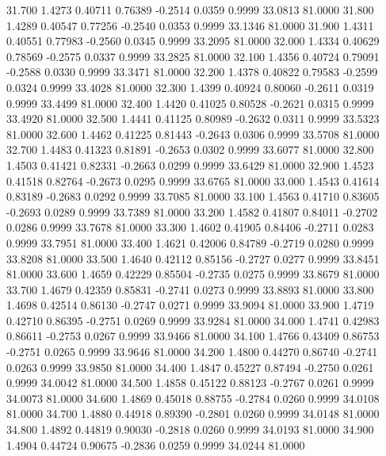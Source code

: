   31.700   1.4273   0.40711   0.76389  -0.2514   0.0359   0.9999  33.0813  81.0000
  31.800   1.4289   0.40547   0.77256  -0.2540   0.0353   0.9999  33.1346  81.0000
  31.900   1.4311   0.40551   0.77983  -0.2560   0.0345   0.9999  33.2095  81.0000
  32.000   1.4334   0.40629   0.78569  -0.2575   0.0337   0.9999  33.2825  81.0000
  32.100   1.4356   0.40724   0.79091  -0.2588   0.0330   0.9999  33.3471  81.0000
  32.200   1.4378   0.40822   0.79583  -0.2599   0.0324   0.9999  33.4028  81.0000
  32.300   1.4399   0.40924   0.80060  -0.2611   0.0319   0.9999  33.4499  81.0000
  32.400   1.4420   0.41025   0.80528  -0.2621   0.0315   0.9999  33.4920  81.0000
  32.500   1.4441   0.41125   0.80989  -0.2632   0.0311   0.9999  33.5323  81.0000
  32.600   1.4462   0.41225   0.81443  -0.2643   0.0306   0.9999  33.5708  81.0000
  32.700   1.4483   0.41323   0.81891  -0.2653   0.0302   0.9999  33.6077  81.0000
  32.800   1.4503   0.41421   0.82331  -0.2663   0.0299   0.9999  33.6429  81.0000
  32.900   1.4523   0.41518   0.82764  -0.2673   0.0295   0.9999  33.6765  81.0000
  33.000   1.4543   0.41614   0.83189  -0.2683   0.0292   0.9999  33.7085  81.0000
  33.100   1.4563   0.41710   0.83605  -0.2693   0.0289   0.9999  33.7389  81.0000
  33.200   1.4582   0.41807   0.84011  -0.2702   0.0286   0.9999  33.7678  81.0000
  33.300   1.4602   0.41905   0.84406  -0.2711   0.0283   0.9999  33.7951  81.0000
  33.400   1.4621   0.42006   0.84789  -0.2719   0.0280   0.9999  33.8208  81.0000
  33.500   1.4640   0.42112   0.85156  -0.2727   0.0277   0.9999  33.8451  81.0000
  33.600   1.4659   0.42229   0.85504  -0.2735   0.0275   0.9999  33.8679  81.0000
  33.700   1.4679   0.42359   0.85831  -0.2741   0.0273   0.9999  33.8893  81.0000
  33.800   1.4698   0.42514   0.86130  -0.2747   0.0271   0.9999  33.9094  81.0000
  33.900   1.4719   0.42710   0.86395  -0.2751   0.0269   0.9999  33.9284  81.0000
  34.000   1.4741   0.42983   0.86611  -0.2753   0.0267   0.9999  33.9466  81.0000
  34.100   1.4766   0.43409   0.86753  -0.2751   0.0265   0.9999  33.9646  81.0000
  34.200   1.4800   0.44270   0.86740  -0.2741   0.0263   0.9999  33.9850  81.0000
  34.400   1.4847   0.45227   0.87494  -0.2750   0.0261   0.9999  34.0042  81.0000
  34.500   1.4858   0.45122   0.88123  -0.2767   0.0261   0.9999  34.0073  81.0000
  34.600   1.4869   0.45018   0.88755  -0.2784   0.0260   0.9999  34.0108  81.0000
  34.700   1.4880   0.44918   0.89390  -0.2801   0.0260   0.9999  34.0148  81.0000
  34.800   1.4892   0.44819   0.90030  -0.2818   0.0260   0.9999  34.0193  81.0000
  34.900   1.4904   0.44724   0.90675  -0.2836   0.0259   0.9999  34.0244  81.0000
